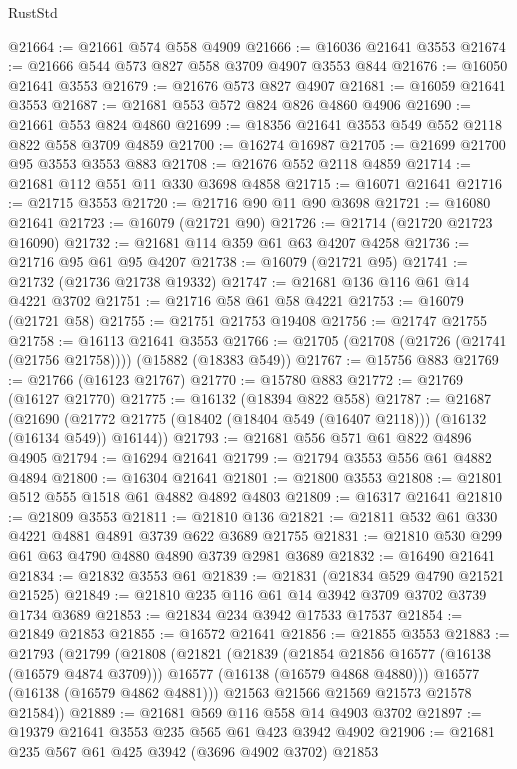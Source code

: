 \begin{lexlean}{RustStd}
\begin{coremodule}
@21664 := @21661 @574 @558 @4909
@21666 := @16036 @21641 @3553
@21674 := @21666 @544 @573 @827 @558 @3709 @4907 @3553 @844
@21676 := @16050 @21641 @3553
@21679 := @21676 @573 @827 @4907
@21681 := @16059 @21641 @3553
@21687 := @21681 @553 @572 @824 @826 @4860 @4906
@21690 := @21661 @553 @824 @4860
@21699 := @18356 @21641 @3553 @549 @552 @2118 @822 @558 @3709 @4859
@21700 := @16274 @16987
@21705 := @21699 @21700 @95 @3553 @3553 @883
@21708 := @21676 @552 @2118 @4859
@21714 := @21681 @112 @551 @11 @330 @3698 @4858
@21715 := @16071 @21641
@21716 := @21715 @3553
@21720 := @21716 @90 @11 @90 @3698
@21721 := @16080 @21641
@21723 := @16079 (@21721 @90)
@21726 := @21714 (@21720 @21723 @16090)
@21732 := @21681 @114 @359 @61 @63 @4207 @4258
@21736 := @21716 @95 @61 @95 @4207
@21738 := @16079 (@21721 @95)
@21741 := @21732 (@21736 @21738 @19332)
@21747 := @21681 @136 @116 @61 @14 @4221 @3702
@21751 := @21716 @58 @61 @58 @4221
@21753 := @16079 (@21721 @58)
@21755 := @21751 @21753 @19408
@21756 := @21747 @21755
@21758 := @16113 @21641 @3553
@21766 := @21705 (@21708 (@21726 (@21741 (@21756 @21758)))) (@15882 (@18383 @549))
@21767 := @15756 @883
@21769 := @21766 (@16123 @21767)
@21770 := @15780 @883
@21772 := @21769 (@16127 @21770)
@21775 := @16132 (@18394 @822 @558)
@21787 := @21687
    (@21690 (@21772 @21775 (@18402 (@18404 @549 (@16407 @2118))) (@16132 (@16134 @549)) @16144))
@21793 := @21681 @556 @571 @61 @822 @4896 @4905
@21794 := @16294 @21641
@21799 := @21794 @3553 @556 @61 @4882 @4894
@21800 := @16304 @21641
@21801 := @21800 @3553
@21808 := @21801 @512 @555 @1518 @61 @4882 @4892 @4803
@21809 := @16317 @21641
@21810 := @21809 @3553
@21811 := @21810 @136
@21821 := @21811 @532 @61 @330 @4221 @4881 @4891 @3739 @622 @3689 @21755
@21831 := @21810 @530 @299 @61 @63 @4790 @4880 @4890 @3739 @2981 @3689
@21832 := @16490 @21641
@21834 := @21832 @3553 @61
@21839 := @21831 (@21834 @529 @4790 @21521 @21525)
@21849 := @21810 @235 @116 @61 @14 @3942 @3709 @3702 @3739 @1734 @3689
@21853 := @21834 @234 @3942 @17533 @17537
@21854 := @21849 @21853
@21855 := @16572 @21641
@21856 := @21855 @3553
@21883 := @21793
    (@21799
      (@21808
        (@21821
          (@21839
            (@21854 @21856 @16577 (@16138 (@16579 @4874 @3709)))
            @16577
            (@16138 (@16579 @4868 @4880)))
          @16577
          (@16138 (@16579 @4862 @4881)))
        @21563
        @21566
        @21569
        @21573
        @21578
        @21584))
@21889 := @21681 @569 @116 @558 @14 @4903 @3702
@21897 := @19379 @21641 @3553 @235 @565 @61 @423 @3942 @4902
@21906 := @21681 @235 @567 @61 @425 @3942 (@3696 @4902 @3702) @21853

\end{coremodule}
\end{lexlean}

